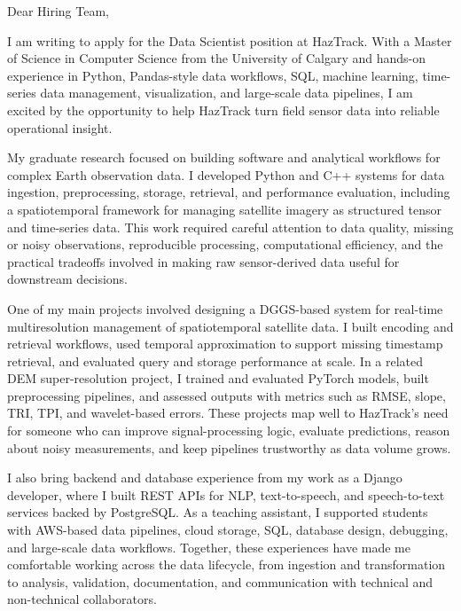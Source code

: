 \documentclass[11pt]{letter}
\begin{document}
\begin{letter}{}

\opening{Dear Hiring Team,}

I am writing to apply for the Data Scientist position at HazTrack. With a Master of Science in Computer Science from the University of Calgary and hands-on experience in Python, Pandas-style data workflows, SQL, machine learning, time-series data management, visualization, and large-scale data pipelines, I am excited by the opportunity to help HazTrack turn field sensor data into reliable operational insight.

My graduate research focused on building software and analytical workflows for complex Earth observation data. I developed Python and C++ systems for data ingestion, preprocessing, storage, retrieval, and performance evaluation, including a spatiotemporal framework for managing satellite imagery as structured tensor and time-series data. This work required careful attention to data quality, missing or noisy observations, reproducible processing, computational efficiency, and the practical tradeoffs involved in making raw sensor-derived data useful for downstream decisions.

One of my main projects involved designing a DGGS-based system for real-time multiresolution management of spatiotemporal satellite data. I built encoding and retrieval workflows, used temporal approximation to support missing timestamp retrieval, and evaluated query and storage performance at scale. In a related DEM super-resolution project, I trained and evaluated PyTorch models, built preprocessing pipelines, and assessed outputs with metrics such as RMSE, slope, TRI, TPI, and wavelet-based errors. These projects map well to HazTrack's need for someone who can improve signal-processing logic, evaluate predictions, reason about noisy measurements, and keep pipelines trustworthy as data volume grows.

I also bring backend and database experience from my work as a Django developer, where I built REST APIs for NLP, text-to-speech, and speech-to-text services backed by PostgreSQL. As a teaching assistant, I supported students with AWS-based data pipelines, cloud storage, SQL, database design, debugging, and large-scale data workflows. Together, these experiences have made me comfortable working across the data lifecycle, from ingestion and transformation to analysis, validation, documentation, and communication with technical and non-technical collaborators.


\end{letter}
\end{document}
